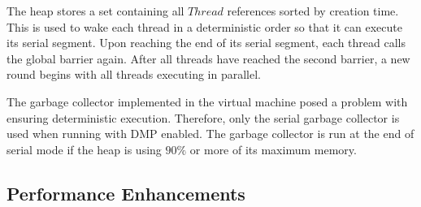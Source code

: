 The heap stores a set containing all $Thread$ references sorted by
creation time.  This is used to wake each thread in a deterministic
order so that it can execute its serial segment.  Upon reaching the
end of its serial segment, each thread calls the global barrier again.
After all threads have reached the second barrier, a new round begins
with all threads executing in parallel.

The garbage collector implemented in the virtual machine posed a
problem with ensuring deterministic execution.  Therefore, only the
serial garbage collector is used when running with DMP enabled.  The
garbage collector is run at the end of serial mode if the heap is
using $90\%$ or more of its maximum memory.

\subsection{Performance Enhancements}

%
% 
% 

